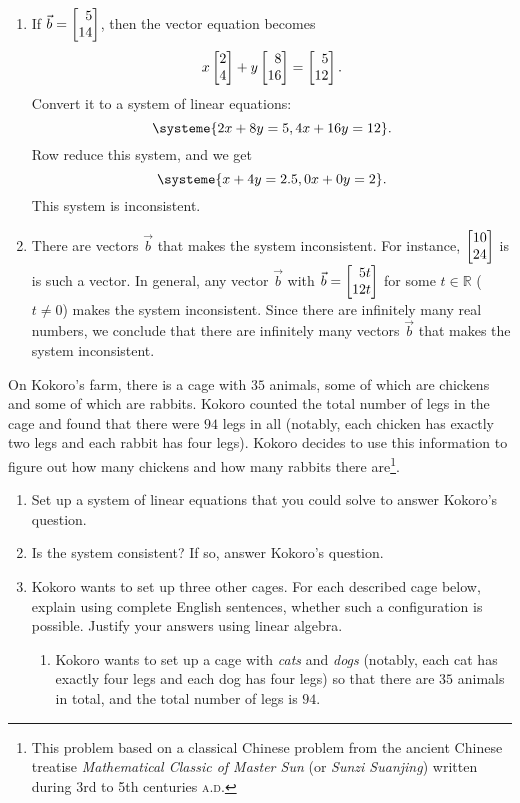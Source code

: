 \begin{exercises}
\begin{problist}
\begin{solution}
\begin{enumerate}
				\item If $\vec b=\mat{5 \\ 14}$, then the vector equation
					becomes
					\[
						x\mat{2 \\ 4}+y\mat{8 \\ 16}=\mat{5 \\ 12}.
					\]
					Convert it to a system of linear equations:
					\[
						\systeme{2x+8y=5,4x+16y=12}.
					\]
					Row reduce this system, and we get
					\[
						\systeme{x+4y=2.5, 0x+0y=2}.
					\]
					This system is inconsistent.

				\item There are vectors $\vec b$ that makes the system inconsistent.
					For instance, $\mat{10 \\ 24}$ is is such a vector. In
					general, any vector $\vec b$ with $\vec b=\mat{5t \\ 12t}$ for
					some $t\in\mathbb{R}$ ($t\ne 0$) makes the system inconsistent.
					Since there are infinitely many real numbers, we conclude that
					there are infinitely many vectors $\vec b$ that makes the system
					inconsistent.
			\end{enumerate}
		\end{solution}

		\prob On Kokoro's farm, there is a cage with $35$ animals, some of which
		are chickens and some of which are rabbits. Kokoro counted the total
		number of legs in the cage and found that there were $94$ legs in all (notably,
		each chicken has exactly two legs and each rabbit has four legs). Kokoro
		decides to use this information to figure out how many chickens and how
		many rabbits there are\footnote{ This problem based on a classical
		Chinese problem from the ancient Chinese treatise \emph{Mathematical
		Classic of Master Sun} (or \emph{Sunzi Suanjing}) written during 3rd to
		5th centuries \textsc{a.d.}}.

		\begin{enumerate}
			\item Set up a system of linear equations that you could solve to answer
				Kokoro's question.

			\item Is the system consistent? If so, answer Kokoro's question.

			\item Kokoro wants to set up three other cages. For each described
				cage below, explain using complete English sentences, whether
				such a configuration is possible. Justify your answers using linear
				algebra.
				\begin{enumerate}
					\item Kokoro wants to set up a cage with \emph{cats} and
						\emph{dogs} (notably, each cat has exactly four legs and
						each dog has four legs) so that there are $35$ animals
						in total, and the total number of legs is $94$.


\end{enumerate}
\end{enumerate}
\end{problist}
\end{exercises}
